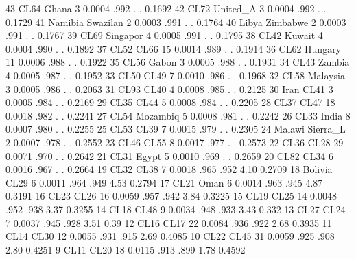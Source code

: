 \documentclass{article}
\begin{document}
\begin{Woutput}
    43    CL64        Ghana            3    0.0004    .992    .        .      0.1692
    42    CL72        United_A         3    0.0004    .992    .        .      0.1729
    41    Namibia     Swazilan         2    0.0003    .991    .        .      0.1764
    40    Libya       Zimbabwe         2    0.0003    .991    .        .      0.1767
    39    CL69        Singapor         4    0.0005    .991    .        .      0.1795
    38    CL42        Kuwait           4    0.0004    .990    .        .      0.1892
    37    CL52        CL66            15    0.0014    .989    .        .      0.1914
    36    CL62        Hungary         11    0.0006    .988    .        .      0.1922
    35    CL56        Gabon            3    0.0005    .988    .        .      0.1931
    34    CL43        Zambia           4    0.0005    .987    .        .      0.1952
    33    CL50        CL49             7    0.0010    .986    .        .      0.1968
    32    CL58        Malaysia         3    0.0005    .986    .        .      0.2063
    31    CL93        CL40             4    0.0008    .985    .        .      0.2125
    30    Iran        CL41             3    0.0005    .984    .        .      0.2169
    29    CL35        CL44             5    0.0008    .984    .        .      0.2205
    28    CL37        CL47            18    0.0018    .982    .        .      0.2241
    27    CL54        Mozambiq         5    0.0008    .981    .        .      0.2242
    26    CL33        India            8    0.0007    .980    .        .      0.2255
    25    CL53        CL39             7    0.0015    .979    .        .      0.2305
    24    Malawi      Sierra_L         2    0.0007    .978    .        .      0.2552
    23    CL46        CL55             8    0.0017    .977    .        .      0.2573
    22    CL36        CL28            29    0.0071    .970    .        .      0.2642
    21    CL31        Egypt            5    0.0010    .969    .        .      0.2659
    20    CL82        CL34             6    0.0016    .967    .        .      0.2664
    19    CL32        CL38             7    0.0018    .965    .952    4.10    0.2709
    18    Bolivia     CL29             6    0.0011    .964    .949    4.53    0.2794
    17    CL21        Oman             6    0.0014    .963    .945    4.87    0.3191
    16    CL23        CL26            16    0.0059    .957    .942    3.84    0.3225
    15    CL19        CL25            14    0.0048    .952    .938    3.37    0.3255
    14    CL18        CL48             9    0.0034    .948    .933    3.43     0.332
    13    CL27        CL24             7    0.0037    .945    .928    3.51      0.39
    12    CL16        CL17            22    0.0084    .936    .922    2.68    0.3935
    11    CL14        CL30            12    0.0055    .931    .915    2.69    0.4085
    10    CL22        CL45            31    0.0059    .925    .908    2.80    0.4251
     9    CL11        CL20            18    0.0115    .913    .899    1.78    0.4592


\end{Woutput}
\end{document}
